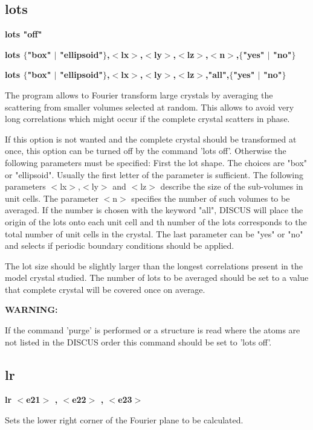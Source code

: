 \subsection*{lots}
{\bf lots "off" \par }
{\bf lots $ \{$"box" $| $ "ellipsoid"$\} $,$ <$lx$> $,$ <$ly$> $,$ <$lz$> $,$ <$n$> $,$ \{$"yes" $| $ "no"$\} $ \par }
{\bf lots $ \{$"box" $| $ "ellipsoid"$\} $,$ <$lx$> $,$ <$ly$> $,$ <$lz$> $,"all",$ \{$"yes" $| $ "no"$\} $ \par }
\par
\vspace{3pt}
The program allows to Fourier transform large crystals by averaging 
the scattering from smaller volumes selected at random. This allows 
to avoid very long correlations which might occur if the complete 
crystal scatters in phase. 
\par
If this option is not wanted and the complete crystal should be 
transformed at once, this option can be turned off by the 
command 'lots off'. Otherwise the following parameters must be 
specified: First the lot shape. The choices are "box" or 
"ellipsoid". Usually the first letter of the parameter is sufficient. 
The following parameters $ <$lx$> $,$ <$ly$> $ and $ <$lz$> $ describe the size of 
the sub-volumes in unit cells. 
The parameter $ <$n$> $ specifies the number of such volumes to be averaged. 
If the number is chosen with the keyword "all", DISCUS will place 
the origin of the lots onto each unit cell and th number of the lots 
corresponds to the total number of unit cells in the crystal. 
The last parameter can be "yes" or "no" and selects if periodic 
boundary conditions should be applied. 
\par
The lot size should be slightly larger than the longest correlations 
present in the model crystal studied. The number of lots to be 
averaged should be set to a value that complete crystal will be 
covered once on average. 
\par
{\bf WARNING: \par }
\vspace{3pt}
If the command 'purge' is performed or a structure is read where the 
atoms are not listed in the DISCUS order this command should be set 
to 'lots off'. 
\subsection*{lr}
{\bf lr $ <$e21$> $ , $ <$e22$> $ , $ <$e23$> $ \par }
\par
\vspace{3pt}
Sets the lower right corner of the Fourier plane to be calculated. 
